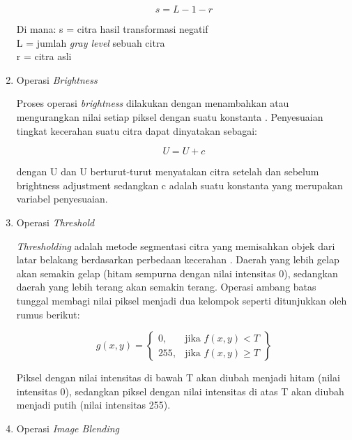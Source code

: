\begin{enumerate}[leftmargin=1cm, itemindent=0.6cm,labelwidth=15pt, labelsep=5pt, listparindent=1cm,align=left]
\begin{equation}
s = L - 1 - r
\end{equation}

Di mana:
s = citra hasil transformasi negatif\\
L = jumlah \textit{gray level} sebuah citra\\
r = citra asli

	\item Operasi \textit{Brightness}

        Proses operasi \textit{brightness} dilakukan dengan menambahkan atau mengurangkan nilai setiap piksel dengan suatu konstanta \cite{SPEKTRUM}. Penyesuaian tingkat kecerahan suatu citra dapat dinyatakan
sebagai:

        \begin{equation}
            U = U + c
        \end{equation}

dengan U dan U berturut-turut menyatakan citra setelah dan sebelum brightness adjustment sedangkan c adalah suatu konstanta yang merupakan variabel penyesuaian.

\item Operasi \textit{Threshold}

    \textit{Thresholding} adalah metode segmentasi citra yang memisahkan objek dari latar belakang berdasarkan perbedaan kecerahan \cite{Setiawan_Dewanta_Nugroho_Supriyono_2019}. Daerah yang lebih gelap akan semakin gelap (hitam sempurna dengan nilai intensitas 0), sedangkan daerah yang lebih terang akan semakin terang. Operasi ambang batas tunggal membagi nilai piksel menjadi dua kelompok seperti ditunjukkan oleh rumus berikut:

        \begin{equation}
            g(x,y) = 
            \left\{
            \begin{array}{ll}
            0, & \text{jika } f(x,y) < T \\
            255, & \text{jika } f(x,y) \geq T 
            \end{array}
            \right \}
        \end{equation}

Piksel dengan nilai intensitas di bawah T akan diubah menjadi hitam (nilai intensitas 0), sedangkan piksel dengan nilai intensitas di atas T akan diubah menjadi putih (nilai intensitas 255).

\item Operasi \textit{Image Blending}


\end{enumerate}
